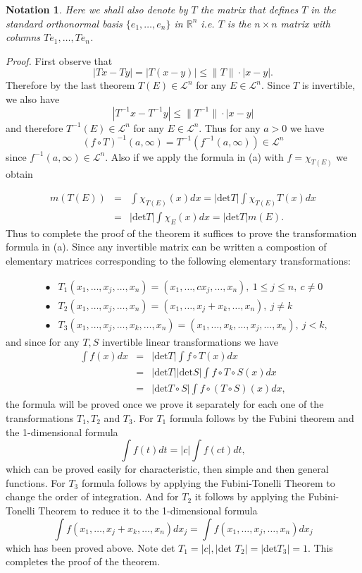 \documentclass[12pt]{report}
\newtheorem{no}[theorem]{Notation}
\begin{document}
\begin{no}  Here we shall also denote by $T$ the matrix that
defines $T$ in the standard orthonormal basis $\{e_1, \dots,
e_n\}$ in $\mathbb{R}^n$ i.e. $T$ is the $n \times n$ matrix with
columns $Te_1, \dots, Te_n$.
\end{no}

\vspace{.25cm}
\noindent
{\em Proof.}  First observe that
\[
|Tx - Ty| = |T(x-y)| \le \|T\|\cdot |x-y|.
\]
Therefore by the last theorem $T(E) \in \mathcal{L}^n$ for any
$E \in \mathcal{L}^n$.  Since $T$ is invertible, we also have
\[
|T^{-1} x - T^{-1}y| \le \|T^{-1}\| \cdot|x-y|
\]
and therefore $T^{-1} (E) \in \mathcal{L}^n$ for any $E \in
\mathcal{L}^n$.  Thus for any $a > 0 $ we have
\[
(f \circ T)^{-1} (a, \infty) = T^{-1} (f^{-1} (a, \infty)) \in
\mathcal{L}^n
\]
since $f^{-1} (a, \infty) \in \mathcal{L}^n$.  Also if we apply the
formula in (a) with $f = \chi_{T(E)}$ we obtain

\begin{eqnarray*}
m(T(E)) &=& \int \chi_{T(E)} (x) dx = |\mbox{det} T| \int\chi_{T(E)}
T(x) dx\\
&=& |\mbox{det} T| \int \chi_E(x) dx = |\mbox{det} T|m(E).
\end{eqnarray*}
Thus to complete the proof of the theorem it suffices to prove
the transformation formula in (a).  Since any invertible matrix
can be written a compostion of elementary matrices
corresponding to the following elementary transformations:

\begin{eqnarray*}
&\bullet& T_1 (x_1, \dots, x_j, \dots, x_n) = (x_1, \dots, cx_j,
\dots, x_n), \ 1 \le j \le n, \ c \ne 0\\
&\bullet& T_2 (x_1, \dots, x_j, \dots, x_n) = (x_1, \dots, x_j +
x_k, \dots, x_n), \ j \ne k\\
&\bullet& T_3 (x_1, \dots, x_j, \dots, x_k, \dots, x_n) = (x_1,
\dots, x_k, \dots, x_j, \dots, x_n), \ j < k,
\end{eqnarray*}
and since for any $T, S$ invertible linear transformations we
have
\begin{eqnarray*}
\int f(x) dx &=& |\mbox{det} T| \int f \circ T(x) dx\\
&=& |\mbox{det} T| |\mbox{det} S| \int f \circ T \circ S(x) dx\\
&=& |\mbox{det} T \circ S| \int f \circ (T \circ S) (x) dx,
\end{eqnarray*}
the formula will be proved once we prove it separately for
each one of the transformations $T_1, T_2$ and $T_3$.  For
$T_1$ formula follows by the Fubini theorem and the
1-dimensional formula
\[
\int f(t) dt = |c| \int f(ct) dt,
\]
which can be proved easily for characteristic, then simple and
then general functions.  For $T_3$ formula follows by applying
the Fubini-Tonelli Theorem to change the order of integration. 
And for $T_2$ it follows by applying the Fubini-Tonelli
Theorem to reduce it to the 1-dimensional formula
\[
\int f(x_1, \dots, x_j + x_k, \dots, x_n) dx_j = \int f(x_1, \dots,
x_j, \dots, x_n)dx_j
\]
which has been proved above.  Note det $T_1 = |c|, |$det $ T_2|
=|$det$  T_3| = 1.$  This completes the proof of the theorem.
\end{document}
